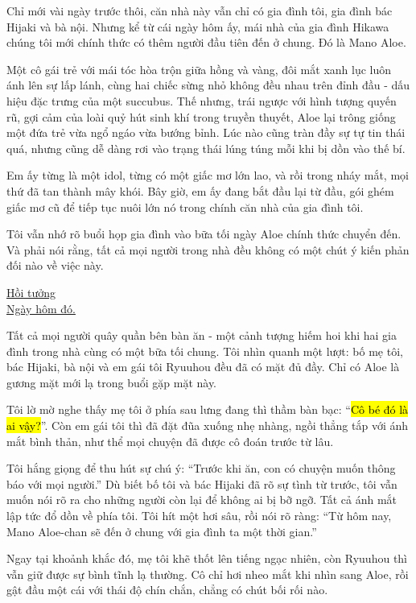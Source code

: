 \documentclass[../main.tex]{subfiles}
\begin{document}
Chỉ mới vài ngày trước thôi, căn nhà này vẫn chỉ có gia đình tôi, gia đình bác Hijaki và bà nội. Nhưng kể từ cái ngày hôm ấy, mái nhà của gia đình Hikawa chúng tôi mới chính thức có thêm người đầu tiên đến ở chung. Đó là Mano Aloe.

Một cô gái trẻ với mái tóc hòa trộn giữa hồng và vàng, đôi mắt xanh lục luôn ánh lên sự lấp lánh, cùng hai chiếc sừng nhỏ không đều nhau trên đỉnh đầu - dấu hiệu đặc trưng của một succubus. Thế nhưng, trái ngược với hình tượng quyến rũ, gợi cảm của loài quỷ hút sinh khí trong truyền thuyết, Aloe lại trông giống một đứa trẻ vừa ngổ ngáo vừa bướng bỉnh. Lúc nào cũng tràn đầy sự tự tin thái quá, nhưng cũng dễ dàng rơi vào trạng thái lúng túng mỗi khi bị dồn vào thế bí.

Em ấy từng là một idol, từng có một giấc mơ lớn lao, và rồi trong nháy mắt, mọi thứ đã tan thành mây khói. Bây giờ, em ấy đang bắt đầu lại từ đầu, gói ghém giấc mơ cũ để tiếp tục nuôi lớn nó trong chính căn nhà của gia đình tôi.

Tôi vẫn nhớ rõ buổi họp gia đình vào bữa tối ngày Aloe chính thức chuyển đến. Và phải nói rằng, tất cả mọi người trong nhà đều không có một chút ý kiến phản đối nào về việc này.

\begin{center}
\uline{Hồi tưởng\\Ngày hôm đó.}
\end{center}

Tất cả mọi người quây quần bên bàn ăn - một cảnh tượng hiếm hoi khi hai gia đình trong nhà cùng có một bữa tối chung. Tôi nhìn quanh một lượt: bố mẹ tôi, bác Hijaki, bà nội và em gái tôi Ryuuhou đều đã có mặt đủ đầy. Chỉ có Aloe là gương mặt mới lạ trong buổi gặp mặt này.

Tôi lờ mờ nghe thấy mẹ tôi ở phía sau lưng đang thì thầm bàn bạc: ``\hl{Cô bé đó là ai vậy?}''. Còn em gái tôi thì đã đặt đũa xuống nhẹ nhàng, ngồi thẳng tắp với ánh mắt bình thản, như thể mọi chuyện đã được cô đoán trước từ lâu.

Tôi hắng giọng để thu hút sự chú ý: ``Trước khi ăn, con có chuyện muốn thông báo với mọi người.'' Dù biết bố tôi và bác Hijaki đã rõ sự tình từ trước, tôi vẫn muốn nói rõ ra cho những người còn lại để không ai bị bỡ ngỡ. Tất cả ánh mắt lập tức đổ dồn về phía tôi. Tôi hít một hơi sâu, rồi nói rõ ràng: ``Từ hôm nay, Mano Aloe-chan sẽ đến ở chung với gia đình ta một thời gian.''

Ngay tại khoảnh khắc đó, mẹ tôi khẽ thốt lên tiếng ngạc nhiên, còn Ryuuhou thì vẫn giữ được sự bình tĩnh lạ thường. Cô chỉ hơi nheo mắt khi nhìn sang Aloe, rồi gật đầu một cái với thái độ chín chắn, chẳng có chút bối rối nào.
\end{document}

